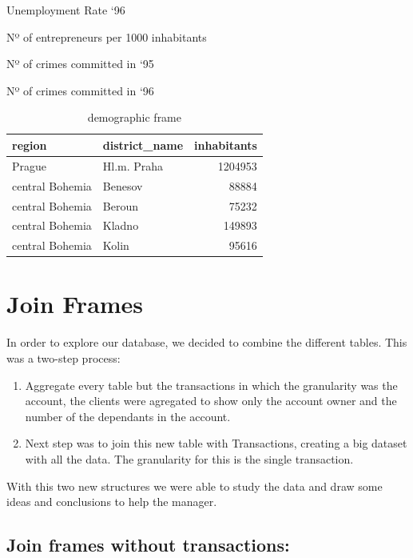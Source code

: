 \documentclass[]{book}
\begin{document}
Unemployment Rate `96

Nº of entrepreneurs per 1000 inhabitants

Nº of crimes committed in `95

Nº of crimes committed in `96

\begin{table}[t]

\caption{\label{tab:unnamed-chunk-11}demographic frame}
\centering
\begin{tabular}{l|l|r}
\hline
region & district\_name & inhabitants\\
\hline
Prague & Hl.m. Praha & 1204953\\
\hline
central Bohemia & Benesov & 88884\\
\hline
central Bohemia & Beroun & 75232\\
\hline
central Bohemia & Kladno & 149893\\
\hline
central Bohemia & Kolin & 95616\\
\hline
\end{tabular}
\end{table}

\chapter{Join Frames}\label{join-frames}

In order to explore our database, we decided to combine the different
tables. This was a two-step process:

\begin{enumerate}
\def\labelenumi{\arabic{enumi}.}
\item
  Aggregate every table but the transactions in which the granularity
  was the account, the clients were agregated to show only the account
  owner and the number of the dependants in the account.
\item
  Next step was to join this new table with Transactions, creating a big
  dataset with all the data. The granularity for this is the single
  transaction.
\end{enumerate}

With this two new structures we were able to study the data and draw
some ideas and conclusions to help the manager.

\section{Join frames without
transactions:}\label{join-frames-without-transactions}
\end{document}
